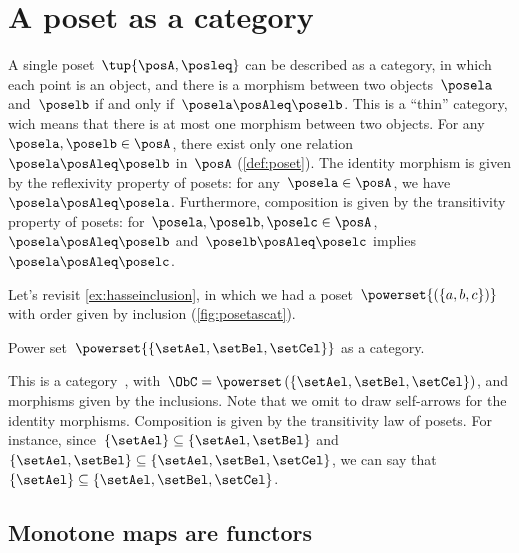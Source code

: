 

\section{A poset as a category}
\label{sec:posetsarecats}

A single poset~$\tup{\posA, \posleq}$ can be described as a category, in which each point is an object, and there is a morphism between two objects~$\posela$ and~$\poselb$ if and only if~$\posela \posAleq \poselb$.
This is a ``thin'' category, wich means that there is at most one morphism between two objects.
For any~$\posela,\poselb\in \posA$, there exist only one relation~$\posela\posAleq \poselb$ in~$\posA$ (\cref{def:poset}).
The identity morphism is given by the reflexivity property of posets: for any~$\posela\in \posA$, we have~$\posela \posAleq \posela$.
Furthermore, composition is given by the transitivity property of posets: for~$\posela,\poselb,\poselc \in \posA$,~$\posela\posAleq \poselb$ and~$\poselb\posAleq \poselc$ implies~$\posela\posAleq \poselc$.

\begin{example}
    Let's revisit \cref{ex:hasseinclusion}, in which we had a poset~$\powerset{\left(\{a,b,c\}\right)}$ with order given by inclusion (\cref{fig:posetascat}).

    \begin{marginfigure}
        \centering
        \caption{Power set~$\powerset{\{\setAel,\setBel,\setCel\}}$ as a category. \label{fig:posetascat}}
    \end{marginfigure}

    This is a category~\CatC, with~$\ObC=\powerset\left(\{\setAel,\setBel,\setCel\}\right)$, and morphisms given by the inclusions.
    Note that we omit to draw self-arrows for the identity morphisms.
    Composition is given by the transitivity law of posets. For instance, since~$\{\setAel\}\subseteq \{\setAel,\setBel\}$ and~$\{\setAel,\setBel\} \subseteq \{\setAel,\setBel,\setCel\}$, we can say that~$\{\setAel\}\subseteq \{\setAel,\setBel,\setCel\}$.
\end{example}

\subsection{Monotone maps are functors}

